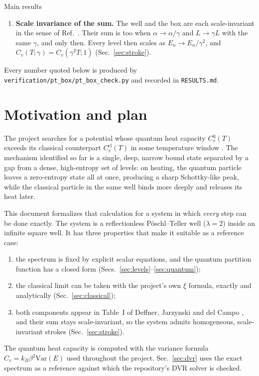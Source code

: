 \documentclass[11pt]{article}
\numberwithin{equation}{section}
\newcommand{\Cq}{C_v^{\mathrm{q}}}
\newcommand{\Ccl}{C_v^{\mathrm{cl}}}
\newcommand{\kB}{k_{B}}
\begin{document}
\begin{resultbox}{Main results}
\begin{enumerate}[leftmargin=*,itemsep=2pt]
\item \textbf{Scale invariance of the sum.} The well and the box are each scale-invariant in the sense of Ref.~\cite{deffner2014}. Their sum is too when $\alpha\to\alpha/\gamma$ and $L\to\gamma L$ with the same $\gamma$, and only then. Every level then scales as $E_n\to E_n/\gamma^2$, and $C_v(T;\gamma)=C_v(\gamma^2T;1)$ (Sec.~\ref{sec:stroke}).
\end{enumerate}
Every number quoted below is produced by \texttt{verification/pt\_box/pt\_box\_check.py} and recorded in \texttt{RESULTS.md}.
\end{resultbox}

\tableofcontents

\section{Motivation and plan}
\label{sec:intro}
The project searches for a potential whose quantum heat capacity $\Cq(T)$ exceeds its classical counterpart $\Ccl(T)$ in some temperature window \cite{gelbwaser2018}. The mechanism identified so far is a single, deep, narrow bound state separated by a gap from a dense, high-entropy set of levels: on heating, the quantum particle leaves a zero-entropy state all at once, producing a sharp Schottky-like peak, while the classical particle in the same well binds more deeply and releases its heat later.

This document formalizes that calculation for a system in which \emph{every} step can be done exactly. The system is a reflectionless P\"oschl--Teller well ($\lambda=2$) inside an infinite square well. It has three properties that make it suitable as a reference case:
\begin{enumerate}[itemsep=1pt]
\item the spectrum is fixed by explicit scalar equations, and the quantum partition function has a closed form (Secs.~\ref{sec:levels}--\ref{sec:quantum});
\item the classical limit can be taken with the project's own $\xi$ formula, exactly and analytically (Sec.~\ref{sec:classical});
\item both components appear in Table~I of Deffner, Jarzynski and del Campo \cite{deffner2014}, and their sum stays scale-invariant, so the system admits homogeneous, scale-invariant strokes (Sec.~\ref{sec:stroke}).
\end{enumerate}
The quantum heat capacity is computed with the variance formula $C_v=\kB\beta^2\mathrm{Var}(E)$ used throughout the project. Sec.~\ref{sec:dvr} uses the exact spectrum as a reference against which the repository's DVR solver is checked.
\end{document}
